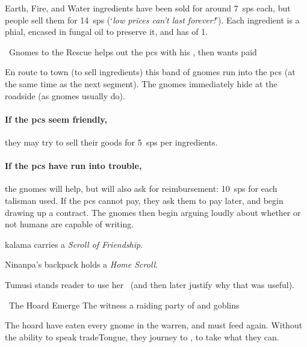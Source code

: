 Earth, Fire, and Water \glspl{ingredient} have been sold for around 7~\glspl{sp} each, but people sell them for 14~\glspl{sp} (`\textit{low prices can't last forever!}').
Each \gls{ingredient} is a phial, encased in fungal oil to preserve it, and has  of 1.

{\squash~Gnomes to the Rescue}%
{ helps out the \glspl{pc} with his , then wants paid}%

En route to town (to sell \glspl{ingredient}) this band of gnomes run into the \glspl{pc} (at the same time as the next \gls{segment}).
The gnomes immediately hide at the roadside (as gnomes usually do).

\paragraph{If the \glspl{pc} seem friendly,}
they may try to sell their goods for 5~\glspl{sp} per \glspl{ingredient}.

\paragraph{If the \glspl{pc} have run into trouble,}
the gnomes will help, but will also ask for reimbursement: 10~\glspl{sp} for each \gls{talisman} used.
If the \glspl{pc} cannot pay, they ask them to pay later, and begin drawing up a contract.
The gnomes then begin arguing loudly about whether or not humans are capable of writing.


\Gls{kalama} carries a \textit{Scroll of Friendship}.

\scrollOfFriendship


Ninanpa's backpack holds a \textit{Home Scroll}.

\homeScroll


Tumusi stands reader to use her \lootTalisman\ (and then later justify why that was useful).

\showTalisman

{~The Hoard Emerge}%
{The  witness a raiding party of  and goblins}%

\begin{exampletext}
  The hoard have eaten every gnome in the \gls{warren}, and must feed again.
  Without the ability to speak \gls{tradeTongue}, they journey to , to take what they can.
\end{exampletext}

